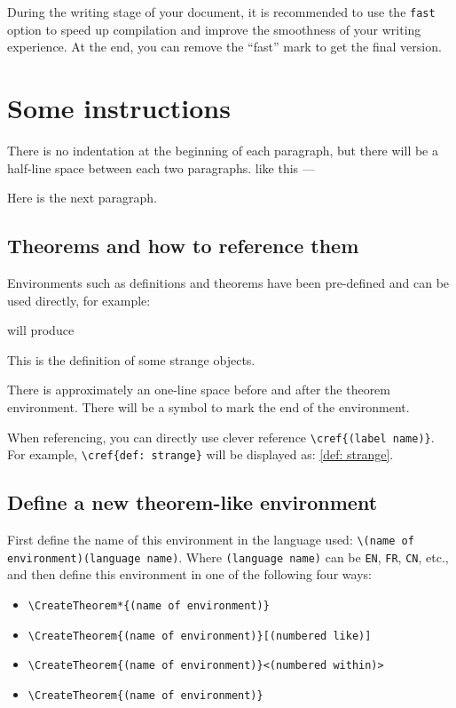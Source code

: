 \documentclass{einfart}
\begin{document}
During the writing stage of your document, it is recommended to use the \verb|fast| option to speed up compilation and improve the smoothness of your writing experience. At the end, you can remove the ``fast'' mark to get the final version.

\section{Some instructions}

There is no indentation at the beginning of each paragraph, but there will be a half-line space between each two paragraphs. like this ---

Here is the next paragraph.

\subsection{Theorems and how to reference them}

Environments such as definitions and theorems have been pre-defined and can be used directly, for example:

There is approximately an one-line space before and after the theorem environment. There will be a symbol to mark the end of the environment.

When referencing, you can directly use clever reference \lstinline|\cref{(label name)}|. For example, \lstinline|\cref{def: strange}| will be displayed as: \cref{def: strange}.

\subsection{Define a new theorem-like environment}

First define the name of this environment in the language used: \lstinline|\(name of environment)(language name)|. Where \lstinline|(language name)| can be \lstinline|EN|, \lstinline|FR|, \lstinline|CN|, etc., and then define this environment in one of the following four ways:
\begin{itemize}
    \item \lstinline|\CreateTheorem*{(name of environment)}|
    \item \lstinline|\CreateTheorem{(name of environment)}[(numbered like)]|
    \item \lstinline|\CreateTheorem{(name of environment)}<(numbered within)>|
    \item \lstinline|\CreateTheorem{(name of environment)}|
\end{itemize}
\end{document}
